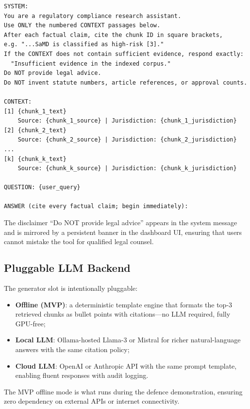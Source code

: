 \begin{lstlisting}[caption={Production prompt template for the RAG compliance
  assistant},label={lst:rag-prompt-full}]
SYSTEM:
You are a regulatory compliance research assistant.
Use ONLY the numbered CONTEXT passages below.
After each factual claim, cite the chunk ID in square brackets,
e.g. "...SaMD is classified as high-risk [3]."
If the CONTEXT does not contain sufficient evidence, respond exactly:
  "Insufficient evidence in the indexed corpus."
Do NOT provide legal advice.
Do NOT invent statute numbers, article references, or approval counts.

CONTEXT:
[1] {chunk_1_text}
    Source: {chunk_1_source} | Jurisdiction: {chunk_1_jurisdiction}
[2] {chunk_2_text}
    Source: {chunk_2_source} | Jurisdiction: {chunk_2_jurisdiction}
...
[k] {chunk_k_text}
    Source: {chunk_k_source} | Jurisdiction: {chunk_k_jurisdiction}

QUESTION: {user_query}

ANSWER (cite every factual claim; begin immediately):
\end{lstlisting}

The disclaimer ``Do NOT provide legal advice'' appears in the system message
and is mirrored by a persistent banner in the dashboard UI, ensuring that
users cannot mistake the tool for qualified legal counsel.

\subsection{Pluggable LLM Backend}
\label{sec:rag-llm}

The generator slot is intentionally pluggable:
\begin{itemize}[noitemsep]
  \item \textbf{Offline (MVP)}: a deterministic template engine that formats
        the top-3 retrieved chunks as bullet points with citations---no LLM
        required, fully GPU-free;
  \item \textbf{Local LLM}: Ollama-hosted Llama-3 or Mistral for richer
        natural-language answers with the same citation policy;
  \item \textbf{Cloud LLM}: OpenAI or Anthropic API with the same prompt
        template, enabling fluent responses with audit logging.
\end{itemize}

The MVP offline mode is what runs during the defence demonstration, ensuring
zero dependency on external APIs or internet connectivity.

